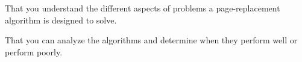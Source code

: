 \item That you understand the different aspects of problems a page-replacement 
algorithm is designed to solve.
\item That you can analyze the algorithms and determine when they perform well 
or perform poorly.
